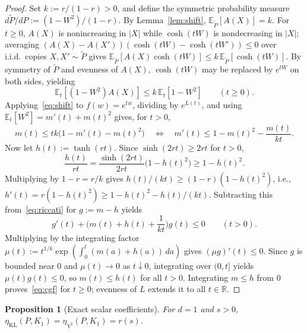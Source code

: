 \documentclass[11pt]{article}
\theoremstyle{plain}
\newtheorem{proposition}[theorem]{Proposition}
\theoremstyle{definition}
\theoremstyle{remark}
\begin{document}
\begin{proof}
Set $k := r/(1 - r) > 0$, and define the symmetric probability measure $d\tilde{P}/dP := (1 - W^2)/(1 - r)$. By Lemma~\ref{lem:shift}, $\mathbb{E}_{\tilde{P}}[A(X)] = k$. For $t \ge 0$, $A(X)$ is nonincreasing in $|X|$ while $\cosh(tW)$ is nondecreasing in $|X|$; averaging $(A(X) - A(X'))(\cosh(tW) - \cosh(tW')) \le 0$ over i.i.d.\ copies $X, X' \sim \tilde{P}$ gives $\mathbb{E}_{\tilde{P}}[A(X)\cosh(tW)] \le k\,\mathbb{E}_{\tilde{P}}[\cosh(tW)]$. By symmetry of $\tilde{P}$ and evenness of $A(X)$, $\cosh(tW)$ may be replaced by $e^{tW}$ on both sides, yielding
\[
\mathbb{E}_t[(1 - W^2)A(X)] \le k\,\mathbb{E}_t[1 - W^2] \qquad (t \ge 0).
\]
Applying~\eqref{eq:shift} to $f(w) = e^{tw}$, dividing by $e^{L(t)}$, and using $\mathbb{E}_t[W^2] = m'(t) + m(t)^2$ gives, for $t > 0$,
\begin{equation}\label{eq:riccati}
m(t) \le tk\bigl(1 - m'(t) - m(t)^2\bigr)
\quad\Longleftrightarrow\quad
m'(t) \le 1 - m(t)^2 - \frac{m(t)}{kt}.
\end{equation}
Now let $h(t) := \tanh(rt)$. Since $\sinh(2rt) \ge 2rt$ for $t > 0$,
\[
\frac{h(t)}{rt} = \frac{\sinh(2rt)}{2rt}\bigl(1 - h(t)^2\bigr) \ge 1 - h(t)^2.
\]
Multiplying by $1 - r = r/k$ gives $h(t)/(kt) \ge (1 - r)(1 - h(t)^2)$, i.e., $h'(t) = r(1 - h(t)^2) \ge 1 - h(t)^2 - h(t)/(kt)$. Subtracting this from~\eqref{eq:riccati} for $g := m - h$ yields
\[
g'(t) + \biggl(m(t) + h(t) + \frac{1}{kt}\biggr) g(t) \le 0 \qquad (t > 0).
\]
Multiplying by the integrating factor $\mu(t) := t^{1/k}\exp(\int_0^t (m(a) + h(a))\,da)$ gives $(\mu g)'(t) \le 0$. Since $g$ is bounded near $0$ and $\mu(t) \to 0$ as $t \downarrow 0$, integrating over $(0, t]$ yields $\mu(t)g(t) \le 0$, so $m(t) \le h(t)$ for all $t > 0$. Integrating $m \le h$ from $0$ proves~\eqref{eq:cgf} for $t \ge 0$; evenness of $L$ extends it to all $t \in \mathbb{R}$.
\end{proof}

\begin{proposition}[Exact scalar coefficients]\label{prop:scalar}
For $d = 1$ and $s > 0$, $\eta_{\mathrm{KL}}(P, K_1) = \eta_{\chi^2}(P, K_1) = r(s)$.
\end{proposition}
\end{document}
